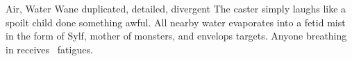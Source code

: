   {Air, Water}%
  {Wane}%
  {duplicated, detailed, divergent}%
  {}%
  {
    The caster simply laughs like a spoilt child done something awful.
    All nearby water evaporates into a fetid mist in the form of Sylf, mother of monsters, and envelops  targets.
    Anyone breathing in receives \showDam~\glspl{fatigue}.
  }%
  {}
